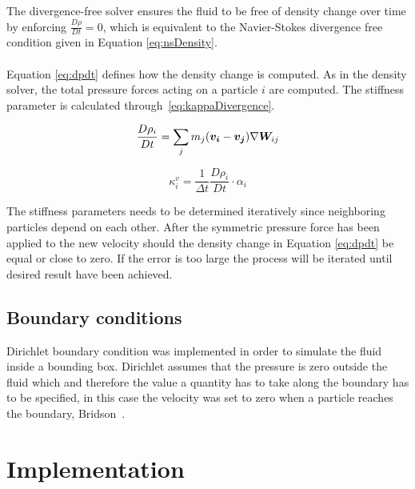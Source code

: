     The divergence-free solver ensures the fluid to be free of density change over time by enforcing $\frac{D\rho}{Dt} = 0$, which is equivalent to the Navier-Stokes divergence free condition given in Equation \ref{eq:nsDensity}. \\ \\ Equation \ref{eq:dpdt} defines how the density change is computed. As in the density solver, the total pressure forces acting on a particle $i$ are computed. The stiffness parameter is calculated through~\ref{eq:kappaDivergence}.

    \begin{equation} \label{eq:dpdt}
        \frac{D\rho_i}{Dt} = \sum_j m_j (\bm{v_i} - \bm{v_j})\nabla \bm{W}_{ij}
    \end{equation}

    \begin{equation}\label{eq:kappaDivergence}
        \kappa_i^v = \frac{1}{\Delta t} \frac{D\rho_i}{Dt} \cdot \alpha_i
    \end{equation}

    The stiffness parameters needs to be determined iteratively since neighboring particles depend on each other. After the symmetric pressure force has been applied to the new velocity should the density change in Equation \ref{eq:dpdt} be equal or close to zero. If the error is too large the process will be iterated until desired result have been achieved.


\subsection{Boundary conditions}
Dirichlet boundary condition was implemented in order to simulate the fluid inside a bounding box. Dirichlet assumes that the pressure is zero outside the fluid which and therefore the value a quantity has to take along the boundary has to be specified, in this case the velocity was set to zero when a particle reaches the boundary, Bridson~\cite{bridson}. 

\section{Implementation}
 


